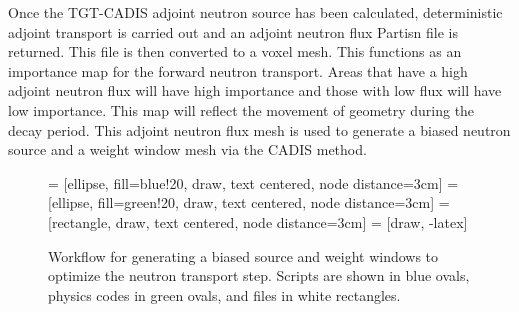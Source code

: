 Once the TGT-CADIS adjoint neutron source has been calculated, deterministic
adjoint transport is carried out and an adjoint neutron flux Partisn file is
returned.  This file is then converted to a voxel mesh.
This functions as an importance map for the forward neutron transport.  Areas
that have a high adjoint neutron flux will have high importance and those with
low flux will have low importance.  This map will reflect the movement of
geometry during the decay period.  This adjoint neutron flux mesh is used to
generate a biased neutron source and a weight window mesh via the CADIS method.


\begin{figure}\label{gen_biased}
\centering

         = [ellipse, fill=blue!20, draw, text centered, node distance=3cm]
         = [ellipse, fill=green!20, draw, text centered, node distance=3cm]
         = [rectangle, draw, text centered, node distance=3cm]
         = [draw, -latex]
        

	\caption[Workflow to generate TGT-CADIS biased source and weight
	windows]
	{Workflow for generating a biased source and weight windows to
	optimize the neutron transport step.  Scripts are shown in
	blue ovals, physics codes in green ovals, and files in white
	rectangles.}
\end{figure}

